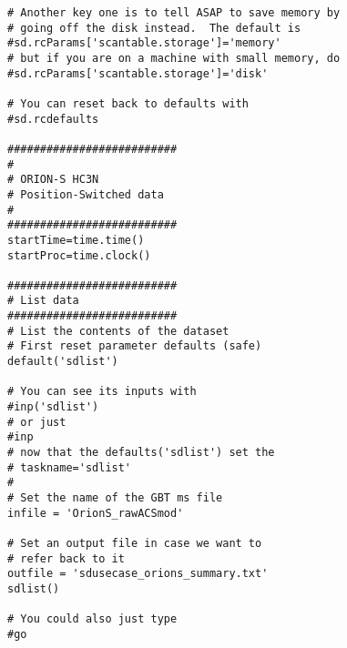 \begin{verbatim}
# Another key one is to tell ASAP to save memory by
# going off the disk instead.  The default is
#sd.rcParams['scantable.storage']='memory'
# but if you are on a machine with small memory, do
#sd.rcParams['scantable.storage']='disk'

# You can reset back to defaults with
#sd.rcdefaults

##########################
#
# ORION-S HC3N
# Position-Switched data
#
##########################
startTime=time.time()
startProc=time.clock()

##########################
# List data
##########################
# List the contents of the dataset
# First reset parameter defaults (safe)
default('sdlist')

# You can see its inputs with
#inp('sdlist')
# or just
#inp
# now that the defaults('sdlist') set the
# taskname='sdlist'
#
# Set the name of the GBT ms file
infile = 'OrionS_rawACSmod'

# Set an output file in case we want to
# refer back to it
outfile = 'sdusecase_orions_summary.txt'
sdlist()

# You could also just type
#go


\end{verbatim}
